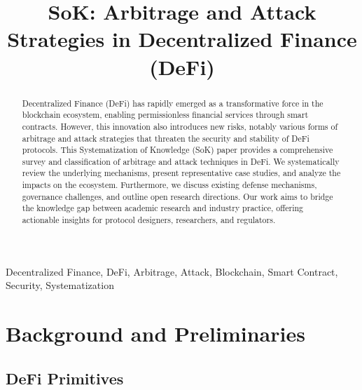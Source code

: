 \documentclass[conference]{IEEEtran}
\begin{document}
\title{SoK: Arbitrage and Attack Strategies in Decentralized Finance (DeFi)}

\author{
\and

\and

\and


}

\maketitle

\begin{abstract}
Decentralized Finance (DeFi) has rapidly emerged as a transformative force in the blockchain ecosystem, enabling permissionless financial services through smart contracts. However, this innovation also introduces new risks, notably various forms of arbitrage and attack strategies that threaten the security and stability of DeFi protocols. This Systematization of Knowledge (SoK) paper provides a comprehensive survey and classification of arbitrage and attack techniques in DeFi. We systematically review the underlying mechanisms, present representative case studies, and analyze the impacts on the ecosystem. Furthermore, we discuss existing defense mechanisms, governance challenges, and outline open research directions. Our work aims to bridge the knowledge gap between academic research and industry practice, offering actionable insights for protocol designers, researchers, and regulators.
\end{abstract}

\begin{IEEEkeywords}
Decentralized Finance, DeFi, Arbitrage, Attack, Blockchain, Smart Contract, Security, Systematization
\end{IEEEkeywords}

\section{Background and Preliminaries}
\subsection{DeFi Primitives}
\end{document}
